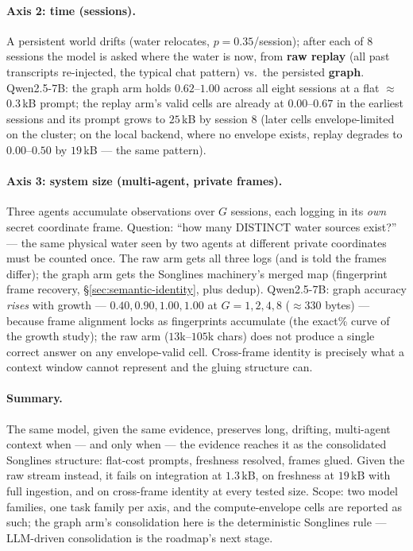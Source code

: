 \documentclass{article}
\begin{document}
\paragraph{Axis 2: time (sessions).}
A persistent world drifts (water relocates, $p{=}0.35$/session); after each of
$8$ sessions the model is asked where the water is now, from \textbf{raw
replay} (all past transcripts re-injected, the typical chat pattern) vs.\ the
persisted \textbf{graph}. Qwen2.5-7B: the graph arm holds $0.62$--$1.00$
across all eight sessions at a flat $\approx$0.3\,kB prompt; the replay arm's
valid cells are already at $0.00$--$0.67$ in the earliest sessions and its
prompt grows to $25$\,kB by session $8$ (later cells envelope-limited on the
cluster; on the local backend, where no envelope exists, replay degrades to
$0.00$--$0.50$ by $19$\,kB --- the same pattern).

\paragraph{Axis 3: system size (multi-agent, private frames).}
Three agents accumulate observations over $G$ sessions, each logging in its
\emph{own} secret coordinate frame. Question: ``how many DISTINCT water sources
exist?'' --- the same physical water seen by two agents at different private
coordinates must be counted once. The raw arm gets all three logs (and is told
the frames differ); the graph arm gets the Songlines machinery's merged map
(fingerprint frame recovery, \S\ref{sec:semantic-identity}, plus dedup).
Qwen2.5-7B: graph accuracy \emph{rises} with growth --- $0.40, 0.90, 1.00,
1.00$ at $G{=}1,2,4,8$ ($\approx$330 bytes) --- because frame alignment locks
as fingerprints accumulate (the exact\% curve of the growth study); the raw arm
($13$k--$105$k chars) does not produce a single correct answer on any
envelope-valid cell. Cross-frame identity is precisely what a context window
cannot represent and the gluing structure can.

\paragraph{Summary.}
The same model, given the same evidence, preserves long, drifting, multi-agent
context when --- and only when --- the evidence reaches it as the consolidated
Songlines structure: flat-cost prompts, freshness resolved, frames glued.
Given the raw stream instead, it fails on integration at $1.3$\,kB, on
freshness at $19$\,kB with full ingestion, and on cross-frame identity at every
tested size. Scope: two model families, one task family per axis, and the
compute-envelope cells are reported as such; the graph arm's consolidation
here is the deterministic Songlines rule --- LLM-driven consolidation is the
roadmap's next stage.
\end{document}
